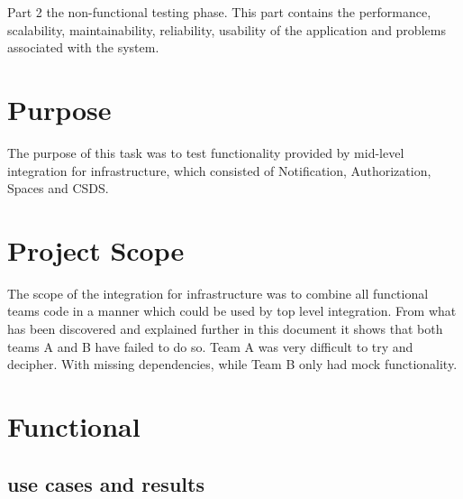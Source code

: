 \documentclass[12pt]{article}
\begin{document}
Part 2 the non-functional testing phase.
This part contains the performance, scalability, maintainability, reliability, usability of the application and problems associated with the system.

\section{Purpose} %
The purpose of this task was to test functionality provided by mid-level integration for infrastructure, which consisted of Notification, Authorization, Spaces and CSDS.


\section{Project Scope} %
The scope of the integration for infrastructure was to combine all functional teams code in a manner which could be used by top level integration. From what has been discovered and explained further in this document it shows that both teams A and B have failed to do so. Team A was very difficult to try and decipher. With missing dependencies, while Team B only had mock functionality.

\section{Functional} %
\subsection{use cases and results}
\end{document}
